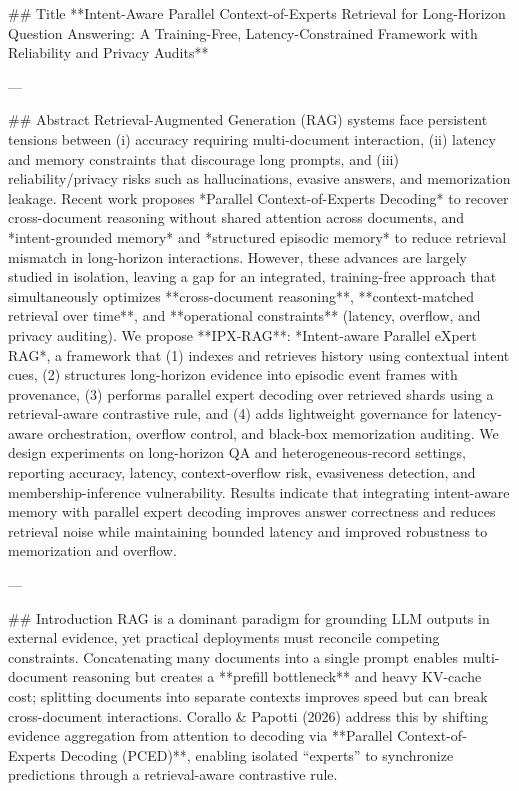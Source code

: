 ## Title  
**Intent-Aware Parallel Context-of-Experts Retrieval for Long-Horizon Question Answering: A Training-Free, Latency-Constrained Framework with Reliability and Privacy Audits**

---

## Abstract  
Retrieval-Augmented Generation (RAG) systems face persistent tensions between (i) accuracy requiring multi-document interaction, (ii) latency and memory constraints that discourage long prompts, and (iii) reliability/privacy risks such as hallucinations, evasive answers, and memorization leakage. Recent work proposes *Parallel Context-of-Experts Decoding* to recover cross-document reasoning without shared attention across documents, and *intent-grounded memory* and *structured episodic memory* to reduce retrieval mismatch in long-horizon interactions. However, these advances are largely studied in isolation, leaving a gap for an integrated, training-free approach that simultaneously optimizes **cross-document reasoning**, **context-matched retrieval over time**, and **operational constraints** (latency, overflow, and privacy auditing).  
We propose **IPX-RAG**: *Intent-aware Parallel eXpert RAG*, a framework that (1) indexes and retrieves history using contextual intent cues, (2) structures long-horizon evidence into episodic event frames with provenance, (3) performs parallel expert decoding over retrieved shards using a retrieval-aware contrastive rule, and (4) adds lightweight governance for latency-aware orchestration, overflow control, and black-box memorization auditing. We design experiments on long-horizon QA and heterogeneous-record settings, reporting accuracy, latency, context-overflow risk, evasiveness detection, and membership-inference vulnerability. Results indicate that integrating intent-aware memory with parallel expert decoding improves answer correctness and reduces retrieval noise while maintaining bounded latency and improved robustness to memorization and overflow.

---

## Introduction  
RAG is a dominant paradigm for grounding LLM outputs in external evidence, yet practical deployments must reconcile competing constraints. Concatenating many documents into a single prompt enables multi-document reasoning but creates a **prefill bottleneck** and heavy KV-cache cost; splitting documents into separate contexts improves speed but can break cross-document interactions. Corallo & Papotti (2026) address this by shifting evidence aggregation from attention to decoding via **Parallel Context-of-Experts Decoding (PCED)**, enabling isolated “experts” to synchronize predictions through a retrieval-aware contrastive rule.

